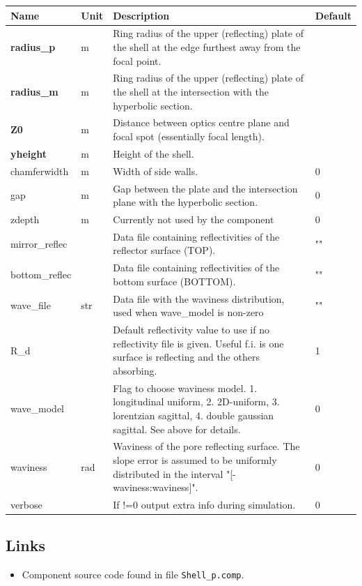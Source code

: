 \begin{longtable}{p{}p{}p{}p{}}
\toprule
\textbf{Name} & \textbf{Unit} & \textbf{Description} & \textbf{Default} \\
\midrule
\endhead
\textbf{radius\_p} & m & Ring radius of the upper (reflecting) plate of the shell at the edge furthest away from the focal point. &  \\
\textbf{radius\_m} & m & Ring radius of the upper (reflecting) plate of the shell at the intersection with the hyperbolic section. &  \\
\textbf{Z0} & m & Distance between optics centre plane and focal spot (essentially focal length). &  \\
\textbf{yheight} & m & Height of the shell. &  \\
chamferwidth & m & Width of side walls. & 0 \\
gap & m & Gap between the plate and the intersection plane with the hyperbolic section. & 0 \\
zdepth & m & Currently not used by the component & 0 \\
mirror\_reflec &   & Data file containing reflectivities of the reflector surface (TOP). & "" \\
bottom\_reflec &   & Data file containing reflectivities of the bottom surface (BOTTOM). & "" \\
wave\_file & str & Data file with the waviness distribution, used when wave\_model is non-zero & "" \\
R\_d &   & Default reflectivity value to use if no reflectivity file is given. Useful f.i. is one surface is reflecting and the others absorbing. & 1 \\
wave\_model &   & Flag to choose waviness model. 1. longitudinal uniform, 2. 2D-uniform, 3. lorentzian sagittal, 4. double gaussian sagittal. See above for details. & 0 \\
waviness & rad & Waviness of the pore reflecting surface. The slope error is assumed to be uniformly distributed in the interval "[-waviness:waviness]". & 0 \\
verbose &   & If !=0 output extra info during simulation. & 0 \\
\bottomrule
\end{longtable}

\subsection*{Links}
\begin{itemize}
  \item Component source code found in file \texttt{Shell\_p.comp}.
\end{itemize}
